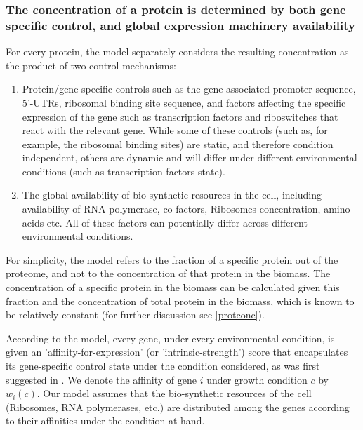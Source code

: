 \subsubsection{The concentration of a protein is determined by both gene specific control, and global
expression machinery availability}
For every protein, the model separately considers the resulting concentration as the product of two control mechanisms:
\begin{enumerate}
\item Protein/gene specific controls such as the gene associated promoter sequence, 5'-UTRs, ribosomal binding site sequence, and factors affecting the specific expression of the gene such as transcription factors and riboswitches that react with the relevant gene.
  While some of these controls (such as, for example, the ribosomal binding sites) are static, and therefore condition independent, others are dynamic and will differ under different environmental conditions (such as transcription factors state).
\item The global availability of bio-synthetic resources in the cell, including availability of RNA polymerase, co-factors, Ribosomes concentration, amino-acids etc.
  All of these factors can potentially differ across different environmental conditions.
\end{enumerate}

For simplicity, the model refers to the fraction of a specific protein out of the proteome, and not to the concentration of that protein in the biomass.
The concentration of a specific protein in the biomass can be calculated given this fraction and the concentration of total protein in the biomass, which is known to be relatively constant \cite{Bremer1987,Scott2014} (for further discussion see \ref{protconc}).

According to the model, every gene, under every environmental condition, is given an 'affinity-for-expression' (or 'intrinsic-strength') score that encapsulates its gene-specific control state under the condition considered, as was first suggested in \cite{Maaloe1969}.
We denote the affinity of gene $i$ under growth condition $c$ by $w_i(c)$.
Our model assumes that the bio-synthetic resources of the cell (Ribosomes, RNA polymerases, etc.) are distributed among the genes according to their affinities under the condition at hand.